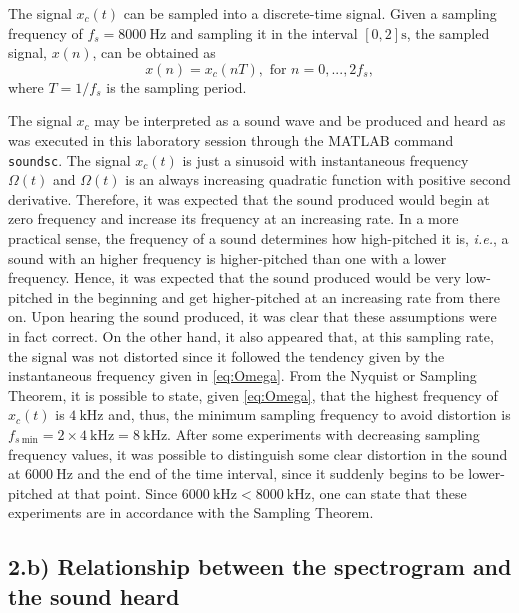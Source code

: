 \documentclass[a4paper, oneside, 11pt]{article}
\begin{document}
The signal $x_c (t)$ can be sampled into a discrete-time signal. Given a sampling frequency of $f_s = \SI{8000}{\hertz}$ and sampling it in the interval $[0,2] \si{\second}$, the sampled signal, $x(n)$, can be obtained as
\begin{equation} \label{eq:x}
    x (n) = x_c (n T), \text{ for } n = 0, ..., 2 f_s,
\end{equation}
where $T = 1/f_s$ is the sampling period.

The signal $x_c$ may be interpreted as a sound wave and be produced and heard as was executed in this laboratory session through the MATLAB{\texttrademark} command \texttt{soundsc}. The signal $x_c(t)$ is just a sinusoid with instantaneous frequency $\Omega (t)$ and $\Omega (t)$ is an always increasing quadratic function with positive second derivative. Therefore, it was expected that the sound produced would begin at zero frequency and increase its frequency at an increasing rate. In a more practical sense, the frequency of a sound determines how high-pitched it is, \textit{i.e.}, a sound with an higher frequency is higher-pitched than one with a lower frequency. Hence, it was expected that the sound produced would be very low-pitched in the beginning and get higher-pitched at an increasing rate from there on. Upon hearing the sound produced, it was clear that these assumptions were in fact correct. On the other hand, it also appeared that, at this sampling rate, the signal was not distorted since it followed the tendency given by the instantaneous frequency given in \eqref{eq:Omega}. From the Nyquist or Sampling Theorem, it is possible to state, given \eqref{eq:Omega}, that the highest frequency of $x_c(t)$ is $\SI{4}{\kilo \hertz}$ and, thus, the minimum sampling frequency to avoid distortion is $f_{s\:\mathrm{min}} = 2\times \SI{4}{\kilo \hertz} = \SI{8}{\kilo \hertz}$. After some experiments with decreasing sampling frequency values, it was possible to distinguish some clear distortion in the sound at $\SI{6000}{\hertz}$ and the end of the time interval, since it suddenly begins to be lower-pitched at that point. Since $\SI{6000}{\kilo \hertz} < \SI{8000}{\kilo \hertz}$, one can state that these experiments are in accordance with the Sampling Theorem.

\subsection{2.b) Relationship between the spectrogram and the sound heard}
\end{document}
